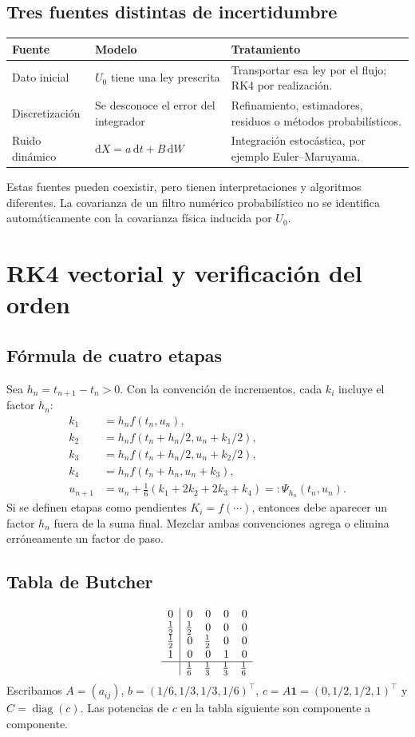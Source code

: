 \documentclass[11pt,a4paper]{article}
\theoremstyle{definition}\newtheorem{definition}[theorem]{Definición}
\theoremstyle{remark}\newtheorem{remark}[theorem]{Observación}
\newcommand{\diag}{\operatorname{diag}}\newcommand{\atol}{\mathrm{atol}}
\begin{document}
\subsection{Tres fuentes distintas de incertidumbre}
\begin{center}\small
\begin{tabularx}{\linewidth}{@{}p{3.4cm}XX@{}}\toprule
Fuente & Modelo & Tratamiento\\\midrule
Dato inicial & $U_0$ tiene una ley prescrita & Transportar esa ley por el flujo; RK4 por realización.\\
Discretización & Se desconoce el error del integrador & Refinamiento, estimadores, residuos o métodos probabilísticos.\\
Ruido dinámico & $\mathrm dX=a\,\mathrm dt+B\,\mathrm dW$ & Integración estocástica, por ejemplo Euler--Maruyama.\\\bottomrule
\end{tabularx}\end{center}
Estas fuentes pueden coexistir, pero tienen interpretaciones y algoritmos
diferentes. La covarianza de un filtro numérico probabilístico no se identifica
automáticamente con la covarianza física inducida por $U_0$.

\clearpage
\section{RK4 vectorial y verificación del orden}
\subsection{Fórmula de cuatro etapas}
Sea $h_n=t_{n+1}-t_n>0$. Con la convención de incrementos, cada $k_i$
incluye el factor $h_n$:
\begin{align}
k_1&=h_n f(t_n,u_n),\\
k_2&=h_n f(t_n+h_n/2,u_n+k_1/2),\\
k_3&=h_n f(t_n+h_n/2,u_n+k_2/2),\\
k_4&=h_n f(t_n+h_n,u_n+k_3),\\
u_{n+1}&=u_n+\frac16(k_1+2k_2+2k_3+k_4)
          =:\Psi_{h_n}(t_n,u_n).\label{eq:rk4}
\end{align}
Si se definen etapas como pendientes $K_i=f(\cdots)$, entonces debe aparecer
un factor $h_n$ fuera de la suma final. Mezclar ambas convenciones agrega o
elimina erróneamente un factor de paso.

\subsection{Tabla de Butcher}
\[
\begin{array}{c|rrrr}
0&0&0&0&0\\
\tfrac12&\tfrac12&0&0&0\\
\tfrac12&0&\tfrac12&0&0\\
1&0&0&1&0\\\hline
&\tfrac16&\tfrac13&\tfrac13&\tfrac16
\end{array}
\]
Escribamos $A=(a_{ij})$, $b=(1/6,1/3,1/3,1/6)^\top$,
$c=A\mathbf1=(0,1/2,1/2,1)^\top$ y $C=\diag(c)$.
Las potencias de $c$ en la tabla siguiente son componente a componente.
\end{document}

